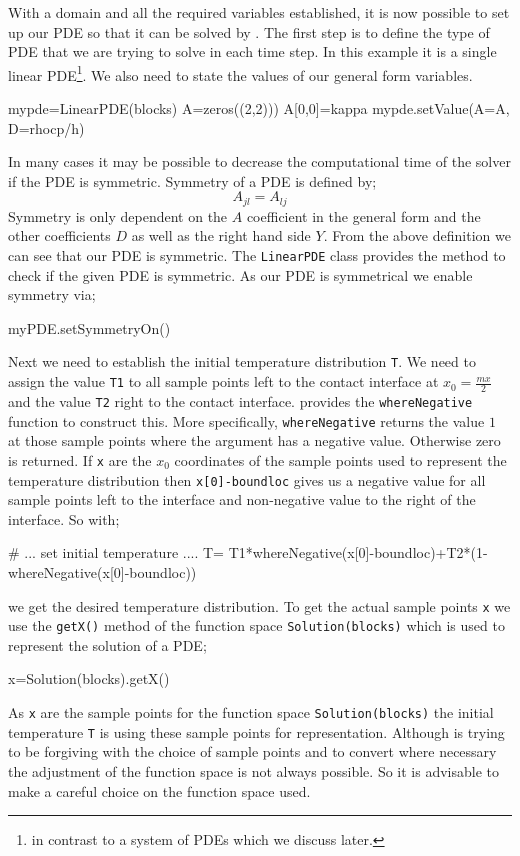 With a domain and all the required variables established, it is now possible to
set up our PDE so that it can be solved by \esc. The first step is to define the
type of PDE that we are trying to solve in each time step. In this example it is
a single linear PDE\footnote{in contrast to a system of PDEs which we discuss
later.}. We also need to state the values of our general form variables.
\begin{python}
mypde=LinearPDE(blocks)
A=zeros((2,2)))
A[0,0]=kappa
mypde.setValue(A=A, D=rhocp/h)
\end{python}
In many cases it may be possible to decrease the computational time of the
solver if the PDE is symmetric. 
Symmetry of a PDE is defined by;
\begin{equation}\label{eqn:symm}
A_{jl}=A_{lj}
\end{equation}
Symmetry is only dependent on the $A$ coefficient in the general form and the
other coefficients $D$ as well as the right hand side $Y$. From the above
definition we can see that our PDE is symmetric. The \verb|LinearPDE| class
provides the method  to check if the given PDE is
symmetric. As our PDE is symmetrical we enable symmetry via;
\begin{python}
myPDE.setSymmetryOn()
\end{python}
Next we need to establish the initial temperature distribution \verb|T|. We need
to 
assign the value \verb|T1| to all sample points left to the contact interface at
$x_{0}=\frac{mx}{2}$
and the value \verb|T2| right to the contact interface. \esc
provides the \verb|whereNegative| function to construct this. More
specifically, \verb|whereNegative| returns the value $1$ at those sample points
where the argument has a negative value. Otherwise zero is returned.
If \verb|x| are the $x_{0}$ 
coordinates of the sample points used to represent the temperature distribution 
then \verb|x[0]-boundloc| gives us a negative value for 
all sample points left to the interface and non-negative value to 
the right of the interface. So with;
\begin{python}
# ... set initial temperature ....
T= T1*whereNegative(x[0]-boundloc)+T2*(1-whereNegative(x[0]-boundloc))
\end{python}
we get the desired temperature distribution. To get the actual sample points
\verb|x| we use the \verb|getX()| method of the function space
\verb|Solution(blocks)| which is used to represent the solution of a PDE;
\begin{python}
x=Solution(blocks).getX()
\end{python}
As \verb|x| are the sample points for the function space
\verb|Solution(blocks)| 
the initial temperature \verb|T| is using these sample points for
representation.
Although \esc is trying to be forgiving with the choice of sample points and to
convert
where necessary the adjustment of the function space is not always possible. So
it is advisable to make a careful choice on the function space used.  

